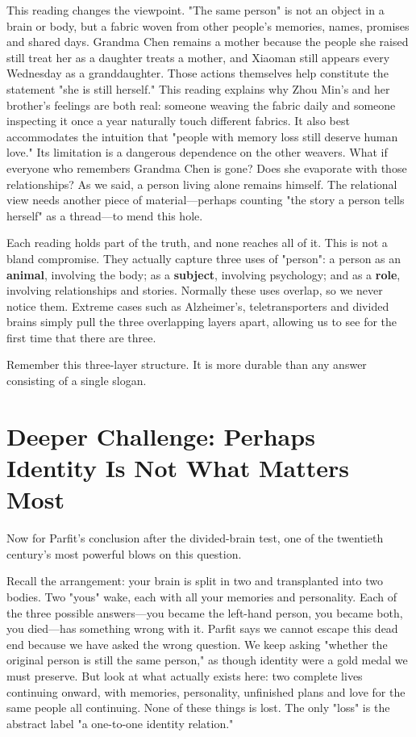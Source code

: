 This reading changes the viewpoint. "The same person" is not an object in a brain or body, but a fabric woven from other people's memories, names, promises and shared days. Grandma Chen remains a mother because the people she raised still treat her as a daughter treats a mother, and Xiaoman still appears every Wednesday as a granddaughter. Those actions themselves help constitute the statement "she is still herself." This reading explains why Zhou Min's and her brother's feelings are both real: someone weaving the fabric daily and someone inspecting it once a year naturally touch different fabrics. It also best accommodates the intuition that "people with memory loss still deserve human love." Its limitation is a dangerous dependence on the other weavers. What if everyone who remembers Grandma Chen is gone? Does she evaporate with those relationships? As we said, a person living alone remains himself. The relational view needs another piece of material---perhaps counting "the story a person tells herself" as a thread---to mend this hole.

Each reading holds part of the truth, and none reaches all of it. This is not a bland compromise. They actually capture three uses of "person": a person as an \textbf{animal}, involving the body; as a \textbf{subject}, involving psychology; and as a \textbf{role}, involving relationships and stories. Normally these uses overlap, so we never notice them. Extreme cases such as Alzheimer's, teletransporters and divided brains simply pull the three overlapping layers apart, allowing us to see for the first time that there are three.

Remember this three-layer structure. It is more durable than any answer consisting of a single slogan.

\section[Deeper Challenge: Beyond Identity]{Deeper Challenge: Perhaps Identity Is Not What Matters Most}
Now for Parfit's conclusion after the divided-brain test, one of the twentieth century's most powerful blows on this question.

Recall the arrangement: your brain is split in two and transplanted into two bodies. Two "yous" wake, each with all your memories and personality. Each of the three possible answers---you became the left-hand person, you became both, you died---has something wrong with it. Parfit says we cannot escape this dead end because we have asked the wrong question. We keep asking "whether the original person is still the same person," as though identity were a gold medal we must preserve. But look at what actually exists here: two complete lives continuing onward, with memories, personality, unfinished plans and love for the same people all continuing. None of these things is lost. The only "loss" is the abstract label "a one-to-one identity relation."

